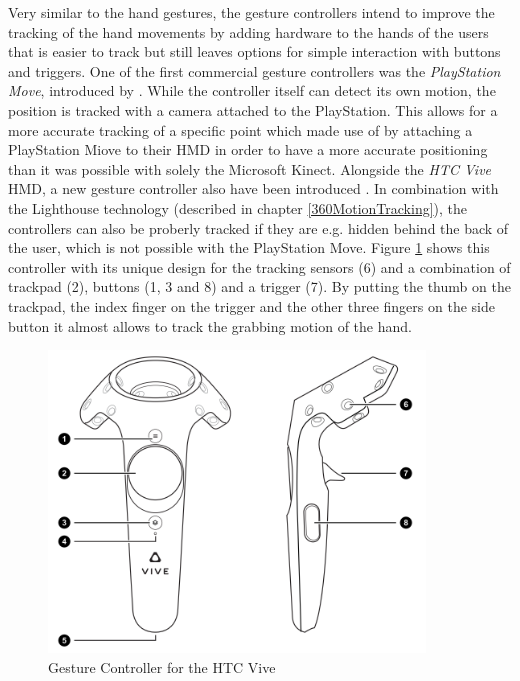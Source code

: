 Very similar to the hand gestures, the gesture controllers intend to improve the tracking of the hand movements by adding hardware to the hands of the users that is easier to track but still leaves options for simple interaction with buttons and triggers. \newline
One of the first commercial gesture controllers was the \textit{PlayStation Move}, introduced by \cite{Sony2010}. While the controller itself can detect its own motion, the position is tracked with a camera attached to the PlayStation. This allows for a more accurate tracking of a specific point which \cite{Takala2014} made use of by attaching a PlayStation Miove to their HMD in order to have a more accurate positioning than it was possible with solely the Microsoft Kinect. \newline
Alongside the \textit{HTC Vive} HMD, a new gesture controller also have been introduced \citep{Htcvive2016}. In combination with the Lighthouse technology (described in chapter \ref{360MotionTracking}), the controllers can also be proberly tracked if they are e.g. hidden behind the back of the user, which is not possible with the PlayStation Move. Figure \ref{fig:gesturecontroller} shows this controller with its unique design for the tracking sensors (6) and a combination of trackpad (2), buttons (1, 3 and 8) and a trigger (7). By putting the thumb on the trackpad, the index finger on the trigger and the other three fingers on the side button it almost allows to track the grabbing motion of the hand.
\begin{figure}[h]
	\begin{center}
		\includegraphics[width=10cm]{03_Figures/05_LitReview/HTCCorp2016_GestureController.png}
		\caption[Gesture Controller for the HTC Vive]{Gesture Controller for the HTC Vive \citep{HTCCorp2016}}
		\label{fig:gesturecontroller}
	\end{center}
\end{figure}


